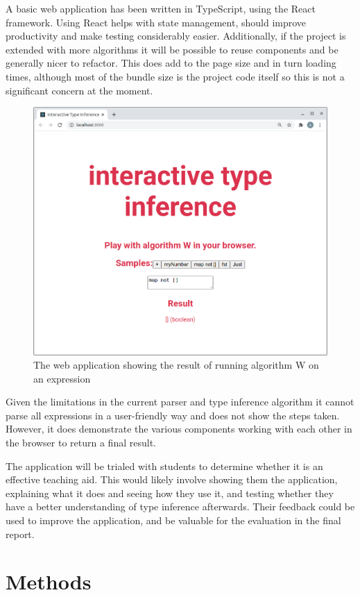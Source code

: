 \documentclass[a4paper,fleqn,12pt]{article}
\begin{document}
A basic web application has been written in TypeScript, using the React framework. Using React helps with state management, should improve productivity and make testing considerably easier. Additionally, if the project is extended with more algorithms it will be possible to reuse components and be generally nicer to refactor. This does add to the page size and in turn loading times, although most of the bundle size is the project code itself so this is not a significant concern at the moment.

{\centering \begin{figure}[h!]
  \centering
  \includegraphics[width=0.818\linewidth]{images/image1.png}
  \caption{The web application showing the result of running algorithm W on an expression}
\end{figure} \par}

Given the limitations in the current parser and type inference algorithm it cannot parse all expressions in a user-friendly way and does not show the steps taken. However, it does demonstrate the various components working with each other in the browser to return a final result.

The application will be trialed with students to determine whether it is an effective teaching aid. This would likely involve showing them the application, explaining what it does and seeing how they use it, and testing whether they have a better understanding of type inference afterwards. Their feedback could be used to improve the application, and be valuable for the evaluation in the final report.

\section{Methods}\label{id:h.em0ria5zbf4p}
\end{document}
